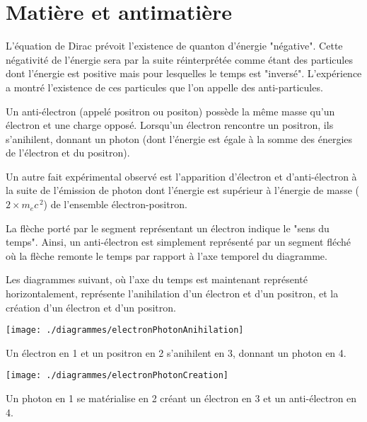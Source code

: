 

\section{Matière et antimatière}



L'équation de Dirac prévoit l'existence de quanton d'énergie "négative". Cette négativité de l'énergie sera par la suite réinterprétée comme étant des particules dont l'énergie est positive mais pour lesquelles le temps est "inversé". L'expérience a montré l'existence de ces particules que l'on appelle des anti-particules.

Un anti-électron (appelé positron ou positon) possède la même masse qu'un électron et une charge opposé. Lorsqu'un électron rencontre un positron, ils s'anihilent, donnant un photon (dont l'énergie est égale à la somme des énergies de l'électron et du positron).

Un autre fait expérimental observé est l'apparition d'électron et d'anti-électron à la suite de l'émission de photon dont l'énergie est supérieur à l'énergie de masse ($2\times m_ec^{\,2}$) de l'ensemble électron-positron.

La flèche porté par le segment représentant un électron indique le "sens du temps". Ainsi, un anti-électron est simplement représenté par un segment fléché où la flèche remonte le temps par rapport à l'axe temporel du diagramme.

Les diagrammes suivant, où l'axe du temps est maintenant représenté horizontalement, représente l'anihilation d'un électron et d'un positron, et la création d'un électron et d'un positron.

\begin{minipage}[c]{.45\linewidth}
\begin{center}
\texttt{[image: ./diagrammes/electronPhotonAnihilation]}
\end{center}
Un électron en 1 et un positron en 2 s'anihilent en 3, donnant un photon en 4.
\end{minipage}
\hfill
\begin{minipage}[c]{.45\linewidth}
\begin{center}
\texttt{[image: ./diagrammes/electronPhotonCreation]}
\end{center}
Un photon en 1 se matérialise en 2 créant un électron en 3 et un anti-électron en 4.
\end{minipage}

